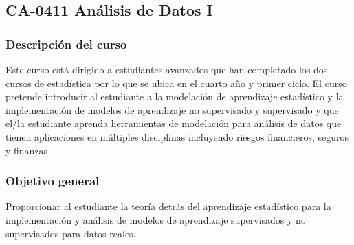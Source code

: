 \newpage
\subsection*{CA-0411 Análisis de Datos I}

\hypertarget{CA0411AnalisisDatos}{}
\begin{refsection}
\begin{table}[H]
\end{table}

\subsubsection*{Descripción del curso}

Este curso está dirigido a estudiantes avanzados que han completado los dos cursos de estadística por lo que se ubica en el cuarto año y primer ciclo. El curso pretende introducir al estudiante a la modelación de aprendizaje estadístico y la implementación de modelos de aprendizaje no supervisado y supervisado y que el/la estudiante aprenda herramientas de modelación para análisis de datos que tienen aplicaciones en múltiples disciplinas incluyendo riesgos financieros, seguros y finanzas.

\subsubsection*{Objetivo general}

Proporcionar al estudiante la teoría detrás del aprendizaje estadístico para la implementación y análisis de modelos de aprendizaje supervisados y no supervisados para datos reales.


\end{refsection}
